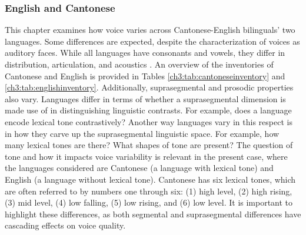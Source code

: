 \subsubsection{English and Cantonese}

This chapter examines how voice varies across Cantonese-English bilinguals' two languages. Some differences are expected, despite the characterization of voices as auditory faces. While all languages have consonants and vowels, they differ in distribution, articulation, and acoustics . An overview of the inventories of Cantonese and English is provided in Tables \ref{ch3:tab:cantoneseinventory} and \ref{ch3:tab:englishinventory}. Additionally, suprasegmental and prosodic properties also vary. Languages differ in terms of whether a suprasegmental dimension is made use of in distinguishing linguistic contrasts. For example, does a language encode lexical tone contrastively? Another way languages vary in this respect is in how they carve up the suprasegmental linguistic space. For example, how many lexical tones are there? What shapes of tone are present? The question of tone and how it impacts voice variability is relevant in the present case, where the languages considered are Cantonese (a language with lexical tone) and English (a language without lexical tone). Cantonese has six lexical tones, which are often referred to by numbers one through six: (1) high level, (2) high rising, (3) mid level, (4) low falling, (5) low rising, and (6) low level. It is important to highlight these differences, as both segmental and suprasegmental differences have cascading effects on voice quality. 

